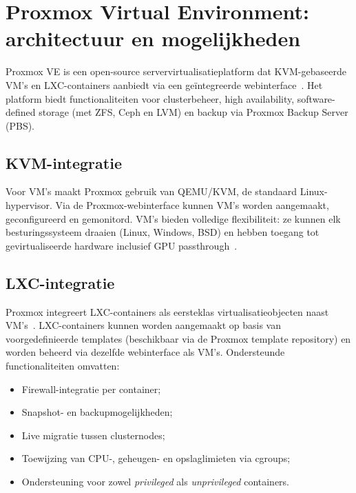 \section{Proxmox Virtual Environment: architectuur en mogelijkheden}
\label{sec:proxmox-architectuur}

Proxmox VE is een open-source servervirtualisatieplatform dat KVM-gebaseerde VM's en LXC-containers aanbiedt via een geïntegreerde webinterface~\autocite{ProxmoxDocs}. Het platform biedt functionaliteiten voor clusterbeheer, high availability, software-defined storage (met ZFS, Ceph en LVM) en backup via Proxmox Backup Server (PBS).

\subsection{KVM-integratie}
\label{subsec:kvm-integratie}

Voor VM's maakt Proxmox gebruik van QEMU/KVM, de standaard Linux-hypervisor. Via de Proxmox-webinterface kunnen VM's worden aangemaakt, geconfigureerd en gemonitord. VM's bieden volledige flexibiliteit: ze kunnen elk besturingssysteem draaien (Linux, Windows, BSD) en hebben toegang tot gevirtualiseerde hardware inclusief GPU passthrough~\autocite{ProxmoxDocs}.

\subsection{LXC-integratie}
\label{subsec:lxc-integratie}

Proxmox integreert LXC-containers als eersteklas virtualisatieobjecten naast VM's~\autocite{ProxmoxWiki}. LXC-containers kunnen worden aangemaakt op basis van voorgedefinieerde templates (beschikbaar via de Proxmox template repository) en worden beheerd via dezelfde webinterface als VM's. Ondersteunde functionaliteiten omvatten:

\begin{itemize}
    \item Firewall-integratie per container;
    \item Snapshot- en backupmogelijkheden;
    \item Live migratie tussen clusternodes;
    \item Toewijzing van CPU-, geheugen- en opslaglimieten via cgroups;
    \item Ondersteuning voor zowel \textit{privileged} als \textit{unprivileged} containers.
\end{itemize}

